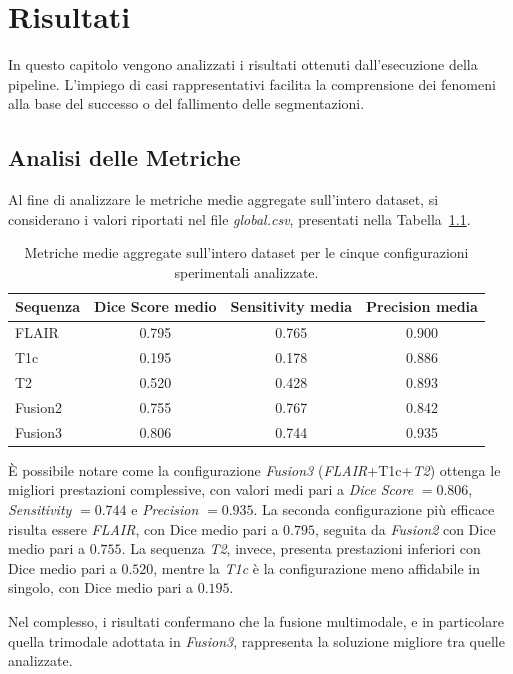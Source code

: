 \chapter{Risultati}
In questo capitolo vengono analizzati i risultati ottenuti dall’esecuzione della pipeline. L'impiego di casi rappresentativi facilita la comprensione dei fenomeni alla base del successo o del fallimento delle segmentazioni.

\section{Analisi delle Metriche}
Al fine di analizzare le metriche medie aggregate sull’intero dataset, si considerano i valori riportati nel file \textit{global.csv}, presentati nella Tabella~\ref{tab:global_metrics}.

\begin{table}[H]
\centering
\caption{Metriche medie aggregate sull’intero dataset per le cinque configurazioni sperimentali analizzate.}
\label{tab:global_metrics}
\begin{tabular}{lccc}
\hline
\textbf{Sequenza} & \textbf{Dice Score medio} & \textbf{Sensitivity media} & \textbf{Precision media} \\
\hline
FLAIR & 0.795 & 0.765 & 0.900 \\
T1c & 0.195 & 0.178 & 0.886 \\
T2 & 0.520 & 0.428 & 0.893 \\
Fusion2 & 0.755 & 0.767 & 0.842 \\
Fusion3 & 0.806 & 0.744 & 0.935 \\
\hline
\end{tabular}
\end{table}

È possibile notare come la configurazione \textit{Fusion3} (\textit{FLAIR}+T1c+\textit{T2}) ottenga le migliori prestazioni complessive, con valori medi pari a \textit{Dice Score} \(= 0.806\), \textit{Sensitivity} \(= 0.744\) e \textit{Precision} \(= 0.935\).
La seconda configurazione più efficace risulta essere \textit{FLAIR}, con Dice medio pari a \(0.795\), seguita da \textit{Fusion2} con Dice medio pari a \(0.755\). La sequenza \textit{T2}, invece, presenta prestazioni inferiori con Dice medio pari a \(0.520\), mentre la \textit{T1c} è la configurazione meno affidabile in singolo, con Dice medio pari a \(0.195\).

Nel complesso, i risultati confermano che la fusione multimodale, e in particolare quella trimodale adottata in \textit{Fusion3}, rappresenta la soluzione migliore tra quelle analizzate.

